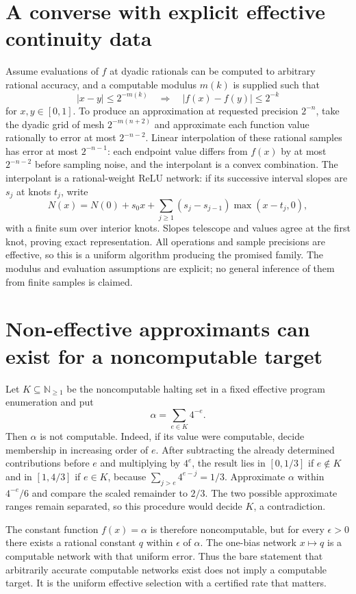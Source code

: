 \documentclass[11pt]{article}
\begin{document}
\section{A converse with explicit effective continuity data}
Assume evaluations of $f$ at dyadic rationals can be computed
to arbitrary rational accuracy, and a computable modulus
$m(k)$ is supplied such that
\[
 |x-y|\le2^{-m(k)}\quad\Longrightarrow\quad
 |f(x)-f(y)|\le2^{-k}
\]
for $x,y\in[0,1]$. To produce an approximation at requested
precision $2^{-n}$, take the dyadic grid of mesh
$2^{-m(n+2)}$ and approximate each function value rationally
to error at most $2^{-n-2}$. Linear interpolation of these
rational samples has error at most $2^{-n-1}$: each endpoint
value differs from $f(x)$ by at most $2^{-n-2}$ before
sampling noise, and the interpolant is a convex combination.
The interpolant is a rational-weight ReLU network: if its
successive interval slopes are $s_j$ at knots $t_j$, write
\[
 N(x)=N(0)+s_0x+\sum_{j\ge1}(s_j-s_{j-1})\max(x-t_j,0),
\]
with a finite sum over interior knots. Slopes telescope and
values agree at the first knot, proving exact representation.
All operations and sample precisions are effective, so this
is a uniform algorithm producing the promised family. The
modulus and evaluation assumptions are explicit; no general
inference of them from finite samples is claimed.

\section{Non-effective approximants can exist for a noncomputable target}
Let $K\subseteq\mathbb N_{\ge1}$ be the noncomputable
halting set in a fixed effective program enumeration and put
\[
 \alpha=\sum_{e\in K}4^{-e}.
\]
Then $\alpha$ is not computable. Indeed, if its value were
computable, decide membership in increasing order of $e$.
After subtracting the already determined contributions before
$e$ and multiplying by $4^e$, the result lies in $[0,1/3]$
if $e\notin K$ and in $[1,4/3]$ if $e\in K$, because
$\sum_{j>e}4^{e-j}=1/3$. Approximate $\alpha$ within
$4^{-e}/6$ and compare the scaled remainder to $2/3$.
The two possible approximate ranges remain separated, so this
procedure would decide $K$, a contradiction.

The constant function $f(x)=\alpha$ is therefore noncomputable,
but for every $\epsilon>0$ there exists a rational constant
$q$ within $\epsilon$ of $\alpha$. The one-bias network
$x\mapsto q$ is a computable network with that uniform error.
Thus the bare statement that arbitrarily accurate computable
networks exist does not imply a computable target. It is the
uniform effective selection with a certified rate that matters.
\end{document}
